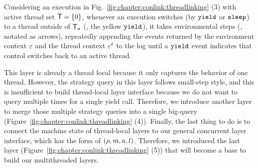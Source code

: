 Considering an execution in Fig.~\ref{fig:chapter:conlink:threadlinking} (3) with active thread set
$\mathsf{T} = \{0\}$, whenever an execution switches (by ${\mathrm{\texttt{yield}}}$ or ${\mathrm{\texttt{sleep}}}$) 
to a thread outside of $\mathsf{T}_a$ (\ie, the yellow ${\mathrm{\texttt{yield}}}$),
it takes environmental steps (\ie, notated as arrows), repeatedly appending the 
events returned by the environment context ${\varepsilon}$ and the thread
context ${\varepsilon}^t$ to the log until a ${\mathrm{\texttt{yield}}}$
event indicates that control switches back to an active thread.


This layer is already a thread local because it only captures the behavior of one thread.
However, the strategy query in this layer follows small-step style, and this is insufficient to build thread-local layer interface because we do not want to query multiple times for a single yield call. 
Therefore, we introduce another  layer to merge those multiple strategy queries into a single big-query (\cf Figure~\ref{fig:chapter:conlink:threadlinking} (4)). 
Finally, the last thing to do is to connect the machine state of thread-local layers to our general concurrent layer interface, which has the form of $(\rho, m, a, l)$.
Therefore, we introduced the last layer (Figure~\ref{fig:chapter:conlink:threadlinking} (5)) that will become a base to build our multithreaded layers.
